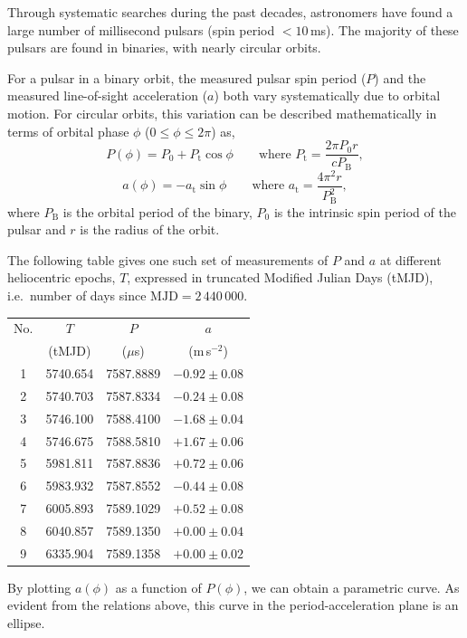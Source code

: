 Through systematic searches during the past decades, astronomers have found a
large number of millisecond pulsars (spin period $< 10$\,ms). The majority of
these pulsars are found in binaries, with nearly circular orbits.

For a pulsar in a binary orbit, the measured pulsar spin period ($P$) and the
measured line-of-sight acceleration ($a$) both vary systematically due to
orbital motion. For circular orbits, this variation can be described
mathematically in terms of orbital phase $\phi$ ($0 \le \phi \le 2\pi$) as,
\[ P(\phi) = P_0 + P_{\mathrm{t}}\cos\phi \qquad \mbox{where }
   P_{\mathrm{t}} = \frac{2\pi P_0 r}{c P_{\mathrm{B}}}, \]
\[ a(\phi) = -a_{\mathrm{t}}\sin\phi \qquad \mbox{where }
   a_{\mathrm{t}} = \frac{4\pi^2 r}{P_{\mathrm{B}}^2}, \]
where $P_{\mathrm{B}}$ is the orbital period of the binary, $P_0$ is the
intrinsic spin period of the pulsar and $r$ is the radius of the orbit.

The following table gives one such set of measurements of $P$ and $a$ at
different heliocentric epochs, $T$, expressed in truncated Modified Julian
Days (tMJD), i.e.\ number of days since $\mathrm{MJD} = 2\,440\,000$.

\begin{center}
\begin{tabular}{cccc}
No. & $T$ & $P$ & $a$ \\
 & (tMJD) & ($\mu$s) & (m\,s$^{-2}$) \\
1 & 5740.654 & 7587.8889 & $-0.92 \pm 0.08$ \\
2 & 5740.703 & 7587.8334 & $-0.24 \pm 0.08$ \\
3 & 5746.100 & 7588.4100 & $-1.68 \pm 0.04$ \\
4 & 5746.675 & 7588.5810 & $+1.67 \pm 0.06$ \\
5 & 5981.811 & 7587.8836 & $+0.72 \pm 0.06$ \\
6 & 5983.932 & 7587.8552 & $-0.44 \pm 0.08$ \\
7 & 6005.893 & 7589.1029 & $+0.52 \pm 0.08$ \\
8 & 6040.857 & 7589.1350 & $+0.00 \pm 0.04$ \\
9 & 6335.904 & 7589.1358 & $+0.00 \pm 0.02$ \\
\end{tabular}
\end{center}

By plotting $a(\phi)$ as a function of $P(\phi)$, we can obtain a parametric
curve. As evident from the relations above, this curve in the
period-acceleration plane is an ellipse.

